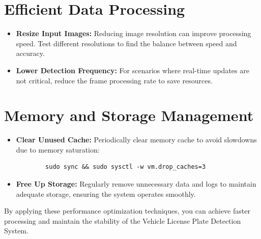 \section{Efficient Data Processing}
\begin{itemize}[label=--, left=1.5em]
	\item \textbf{Resize Input Images:} Reducing image resolution can improve processing speed. Test different resolutions to find the balance between speed and accuracy.
	\item \textbf{Lower Detection Frequency:} For scenarios where real-time updates are not critical, reduce the frame processing rate to save resources.
\end{itemize}

\section{Memory and Storage Management}
\begin{itemize}[label=--, left=1.5em]
	\item \textbf{Clear Unused Cache:} Periodically clear memory cache to avoid slowdowns due to memory saturation:
	\begin{verbatim}
		sudo sync && sudo sysctl -w vm.drop_caches=3
	\end{verbatim}
	\item \textbf{Free Up Storage:} Regularly remove unnecessary data and logs to maintain adequate storage, ensuring the system operates smoothly.
\end{itemize}

By applying these performance optimization techniques, you can achieve faster processing and maintain the stability of the Vehicle License Plate Detection System.
